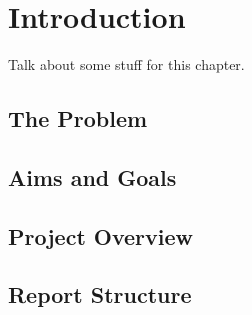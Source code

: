 \chapter{Introduction}
Talk about some stuff for this chapter.

\section{The Problem}

\section{Aims and Goals}

\section{Project Overview}

\section{Report Structure}
